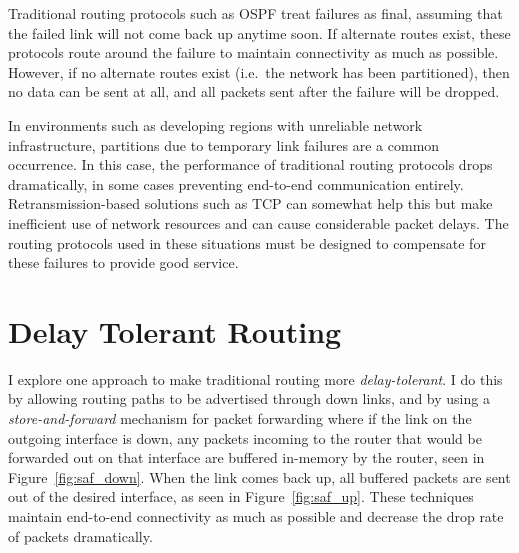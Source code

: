 \documentclass[withindex,glossary,openany]{cam-thesis}
\begin{document}
Traditional routing protocols such as OSPF treat failures as final, assuming that the failed link will not come back up anytime soon. If alternate routes exist, these protocols route around the failure to maintain connectivity as much as possible. However, if no alternate routes exist (i.e.\ the network has been partitioned), then no data can be sent at all, and all packets sent after the failure will be dropped.

In environments such as developing regions with unreliable network infrastructure, partitions due to temporary link failures are a common occurrence. In this case, the performance of traditional routing protocols drops dramatically, in some cases preventing end-to-end communication entirely. Retransmission-based solutions such as TCP can somewhat help this but make inefficient use of network resources and can cause considerable packet delays. The routing protocols used in these situations must be designed to compensate for these failures to provide good service.

\section{Delay Tolerant Routing}

I explore one approach to make traditional routing more \textit{delay-tolerant}. I do this by allowing routing paths to be advertised through down links, and by using a \textit{store-and-forward} mechanism \cite{SAF} for packet forwarding where if the link on the outgoing interface is down, any packets incoming to the router that would be forwarded out on that interface are buffered in-memory by the router, seen in Figure~\ref{fig:saf_down}. When the link comes back up, all buffered packets are sent out of the desired interface, as seen in Figure~\ref{fig:saf_up}. These techniques maintain end-to-end connectivity as much as possible and decrease the drop rate of packets dramatically.
\end{document}
